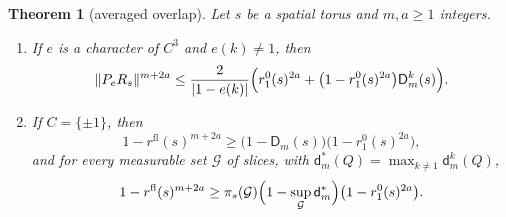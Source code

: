 \documentclass[11pt,a4paper]{amsart}
\newtheorem{theorem}{Theorem}[section]
\theoremstyle{definition}
\theoremstyle{remark}
\numberwithin{equation}{section}
\newcommand{\norm}[1]{\lVert #1\rVert}     %
\newcommand{\abs}[1]{\lvert #1\rvert}      %
\begin{document}
\begin{theorem}[averaged overlap]\label{thm:averaged-overlap}
Let $s$ be a spatial torus and $m,a\ge1$ integers.
\begin{enumerate}[label=\textup{(\alph*)},leftmargin=*]
\item If $e$ is a character of $C^3$ and $e(k)\ne1$, then
\[
\norm{P_eR_s}^{m+2a}\le\frac2{\abs{1-e(k)}}\Bigl(r_1^0(s)^{2a}+\bigl(1-r_1^0(s)^{2a}\bigr)\mathsf D^k_m(s)\Bigr).
\]
\item If $C=\{\pm1\}$, then
\begin{equation}\label{eq:averaged-overlap}
1-r^{\mathrm{fl}}(s)^{m+2a}\ge\bigl(1-\mathsf D_m(s)\bigr)\bigl(1-r_1^0(s)^{2a}\bigr),
\end{equation}
and for every measurable set $\mathcal G$ of slices, with $\mathsf d^\ast_m(Q)=\max_{k\ne1}\mathsf d^k_m(Q)$,
\[
1-r^{\mathrm{fl}}(s)^{m+2a}\ge\pi_s(\mathcal G)\Bigl(1-\sup_{\mathcal G}\mathsf d^\ast_m\Bigr)\bigl(1-r_1^0(s)^{2a}\bigr).
\]
\end{enumerate}
\end{theorem}
\end{document}
